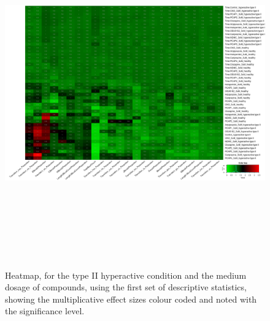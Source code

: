 \documentclass[a4paper,12pt]{article}
\begin{document}
\begin{figure}[h!]
\begin{center}
\includegraphics[width=16cm,height=15cm]{DarkPTZ_heatmap_3_microM_DarkPTZ_B2MAP.png}
\caption{Heatmap, for the type II hyperactive condition and the medium dosage of compounds, using the first set of descriptive statistics, showing the multiplicative effect sizes colour coded and noted with the significance level.}
\end{center}
\end{figure}
\newpage
\end{document}
